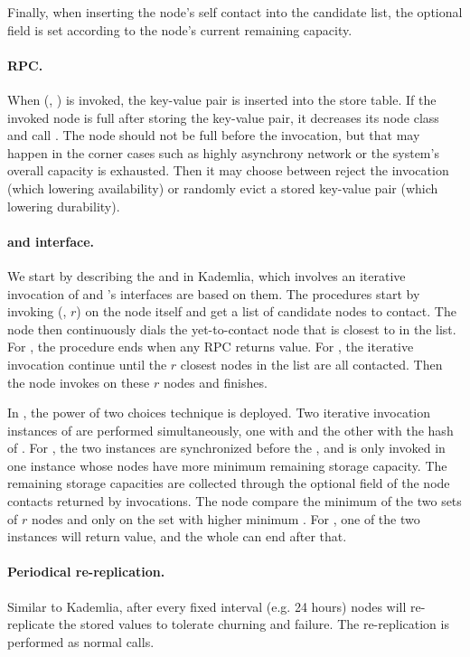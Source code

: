 Finally, when inserting the node's self contact into the candidate list, the optional  field is set according to the node's current remaining capacity.

\paragraph{{\normalfont\fpush} RPC\@.}
When \fpush(, ) is invoked, the key-value pair is inserted into the store table.
If the invoked node is full after storing the key-value pair, it decreases its node class and call \fupdate.
The node should not be full before the invocation, but that may happen in the corner cases such as highly asynchrony network or the system's overall capacity is exhausted.
Then it may choose between reject the invocation (which lowering availability) or randomly evict a stored key-value pair (which lowering durability).

\paragraph{{\normalfont\fput} and {\normalfont\fget} interface.}
We start by describing the \fput and \fget in Kademlia, which involves an iterative invocation of \ffind and \dht's interfaces are based on them.
The procedures start by invoking \ffind(, $r$) on the node itself and get a list of candidate nodes to contact.
The node then continuously dials the yet-to-contact node that is closest to  in the list.
For \fget, the procedure ends when any \ffind RPC returns value.
For \fput, the iterative invocation continue until the $r$ closest nodes in the list are all contacted.
Then the node invokes \fpush on these $r$ nodes and finishes.

In \dht, the power of two choices technique is deployed.
Two iterative invocation instances of \ffind are performed simultaneously, one with  and the other with the hash of .
For \fput, the two instances are synchronized before the \fpush, and \fpush is only invoked in one instance whose nodes have more minimum remaining storage capacity.
The remaining storage capacities are collected through the optional  field of the node contacts returned by \ffind invocations.
The node compare the minimum  of the two sets of $r$ nodes and only \fpush on the set with higher minimum .
For \fget, one of the two instances will return value, and the whole \fget can end after that.

\paragraph{Periodical re-replication.}
Similar to Kademlia, after every fixed interval (e.g. 24 hours) nodes will re-replicate the stored values to tolerate churning and failure.
The re-replication is performed as normal \fput calls.

